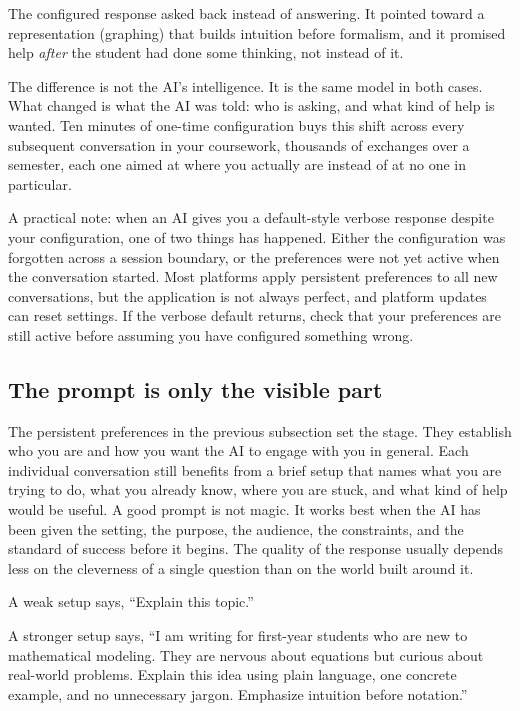 \documentclass{SIAMbook2023}
\begin{document}
The configured response asked back instead of answering. It pointed toward a representation (graphing) that builds intuition before formalism, and it promised help \emph{after} the student had done some thinking, not instead of it.

The difference is not the AI's intelligence. It is the same model in both cases. What changed is what the AI was told: who is asking, and what kind of help is wanted. Ten minutes of one-time configuration buys this shift across every subsequent conversation in your coursework, thousands of exchanges over a semester, each one aimed at where you actually are instead of at no one in particular.

A practical note: when an AI gives you a default-style verbose response despite your configuration, one of two things has happened. Either the configuration was forgotten across a session boundary, or the preferences were not yet active when the conversation started. Most platforms apply persistent preferences to all new conversations, but the application is not always perfect, and platform updates can reset settings. If the verbose default returns, check that your preferences are still active before assuming you have configured something wrong.

\subsection{The prompt is only the visible part}
\label{subsec:prompt-and-setup}%

The persistent preferences in the previous subsection set the stage. They establish who you are and how you want the AI to engage with you in general. Each individual conversation still benefits from a brief setup that names what you are trying to do, what you already know, where you are stuck, and what kind of help would be useful. A good prompt is not magic. It works best when the AI has been given the setting, the purpose, the audience, the constraints, and the standard of success before it begins. The quality of the response usually depends less on the cleverness of a single question than on the world built around it.

A weak setup says, ``Explain this topic.''

A stronger setup says, ``I am writing for first-year students who are new to mathematical modeling. They are nervous about equations but curious about real-world problems. Explain this idea using plain language, one concrete example, and no unnecessary jargon. Emphasize intuition before notation.''
\end{document}
